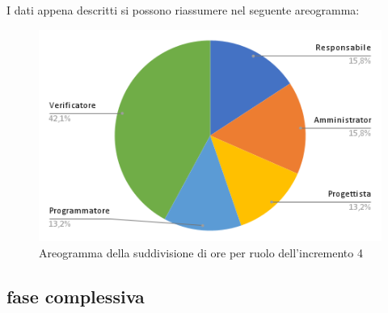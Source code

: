 \pagebreak
I dati appena descritti si possono riassumere nel seguente areogramma:
\begin{figure}[!h]
    \vspace{5px}
    \includegraphics[scale=0.5]{../../../Images/Diagrammi/Diagramma a torta/areogrammaIncremento17.png}
    \centering
    \caption{Areogramma della suddivisione di ore per ruolo dell'incremento 4}
\end{figure}

\subsection{fase complessiva}
